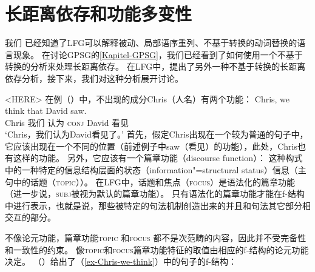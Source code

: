 \section{长距离依存和功能多变性}
\label{Abschnitt-NLA-LFG}

我们
已经知道了LFG可以解释被动、局部语序重列、不基于转换的动词替换的语言现象。
在讨论GPSG的\ref{Kapitel-GPSG}，我们已经看到了如何使用一个不基于转换的分析来处理长距离依存。
在LFG中，\citet{KZ89a}提出了另外一种不基于转换的长距离依存分析，接下来，我们对这种分析展开讨论。

<HERE>
\addlines[-1]
在例（）中，不出现的成分Chris（人名）有两个功能：
\ea
\label{ex-Chris-we-think}
\gll Chris, we think that David saw.\\
Chris 我们 认为 \textsc{conj} David  看见\\
\glt `Chris，我们认为David看见了。'
\z
首先，假定Chris出现在一个较为普通的句子中，它应该出现在一个不同的位置（前述例子中saw（看见）的\lfgobj 功能），此处，Chris也有这样的功能。
另外，它应该有一个篇章功能（discourse function）：
这种构式中的一种特定的信息结构层面的状态（information"=structural status）信息（主句中的话题（\textsc{topic}））。
在LFG中，话题和焦点（\textsc{focus}）是语法化的篇章功能（进一步说，\textsc{subj}被视为默认的篇章功能）。
只有语法化的篇章功能才能在f-结构中进行表示，也就是说，那些被特定的句法机制创造出来的并且和句法其它部分相交互的部分。

不像论元功能，篇章功能\textsc{topic}
和\textsc{focus}
都不是次范畴的内容，因此并不受完备性和一致性的约束。
像\textsc{topic}和\textsc{focus}篇章功能特征的取值由相应的f-结构的论元功能决定。
（）给出了（\ref{ex-Chris-we-think}）中的句子的f-结构：

\ea
{}
\z

